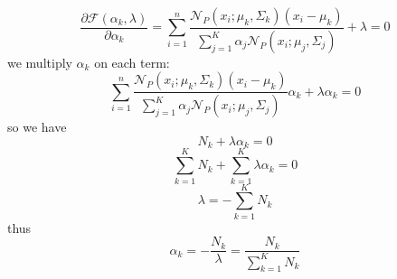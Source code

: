 \documentclass[12pt,a4paper]{article}
\begin{document}
\begin{itemize}
\begin{equation}
    \frac{\partial \mathcal{F}(\alpha_k, \lambda) }{ \partial \alpha_k } = 
    \sum_{i = 1}^n \frac{\mathcal{N}_P(x_i;\mu_k,\Sigma_k)(x_i - \mu_k)}{\sum_{j = 1}^K \alpha_j\mathcal{N}_P(x_i;\mu_j,\Sigma_j)} + \lambda= 0
\end{equation}
we multiply $\alpha_k$ on each term:
\begin{equation}
     \sum_{i = 1}^n \frac{\mathcal{N}_P(x_i;\mu_k,\Sigma_k)(x_i - \mu_k)}{\sum_{j = 1}^K \alpha_j\mathcal{N}_P(x_i;\mu_j,\Sigma_j)}\alpha_k + \lambda\alpha_k= 0
\end{equation}
so we have
\begin{equation}
    N_k+ \lambda\alpha_k = 0
\end{equation}
\begin{equation}
    \sum_{k=1}^K N_k+ \sum_{k=1}^K \lambda\alpha_k = 0
\end{equation}
\begin{equation}
    \lambda = -\sum_{k=1}^K N_k
\end{equation}{}
thus
\begin{equation}\label{eq:alpha}
    \alpha_k = - \frac{N_k}{\lambda} = \frac{N_k}{\sum_{k=1}^K N_k}
\end{equation}
\end{itemize}
\end{document}
